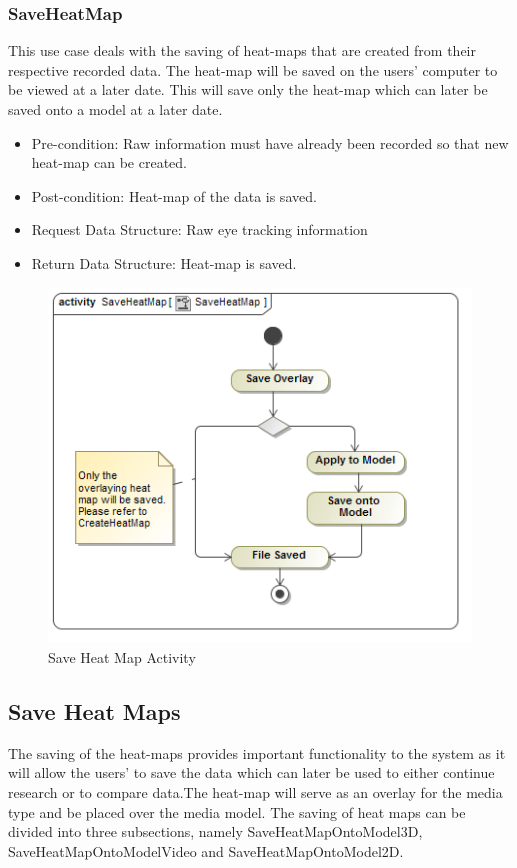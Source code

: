 	\subsubsection{SaveHeatMap}
	This use case deals with the saving of heat-maps that are created from their respective recorded data. The heat-map will be saved on the users' computer to be viewed at a later date. This will save only the heat-map which can later be saved onto a model at a later date.
	\begin{itemize}
		\item Pre-condition: Raw information must have already been recorded so that new heat-map can be created.
		\item Post-condition: Heat-map of the data is saved.
		\item Request Data Structure: Raw eye tracking information
		\item Return Data Structure: Heat-map is saved.
	\end{itemize}
	
	\begin{figure}[!ht]
		\centering
		\includegraphics[scale=0.5,width=15cm,keepaspectratio]{Diagrams/Activity_Diagram__SaveHeatMap__SaveHeatMap.png}
		\caption{Save Heat Map Activity}
	\end{figure}
	
\subsection{Save Heat Maps}
	The saving of the heat-maps provides important functionality to the system as it will allow the users' to save the data which can later be used to either continue research or to compare data.The heat-map will serve as an overlay for the media type and be placed over the media model. The saving of heat maps can be divided into three subsections, namely SaveHeatMapOntoModel3D, SaveHeatMapOntoModelVideo and SaveHeatMapOntoModel2D.
	\newline
	
